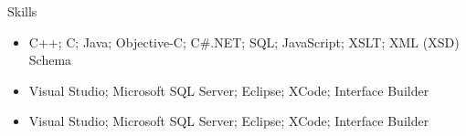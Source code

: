 \documentclass[]{Sohaib-Mohamed}
\begin{document}
\begin{cvsection}{Skills}
   \begin{cvsubsection}{}{}{}
      \begin{itemize}
         \item C++; C; Java; Objective-C; C\#.NET; SQL; JavaScript; XSLT; XML (XSD) Schema
         \item Visual Studio; Microsoft SQL Server; Eclipse; XCode; Interface Builder
         \item Visual Studio; Microsoft SQL Server; Eclipse; XCode; Interface Builder
      \end{itemize}
   \end{cvsubsection}
\end{cvsection}
\end{document}

